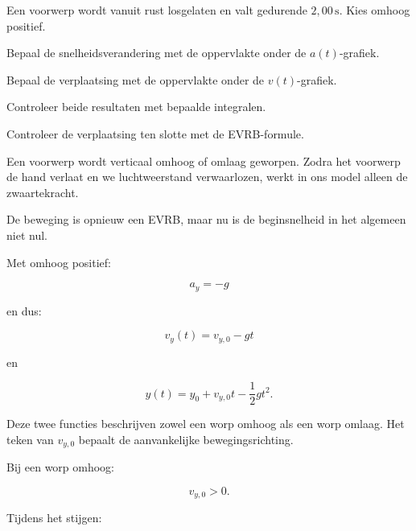 \documentclass{ximera}
\begin{document}
\begin{oefening}{\oefU\ESS}

Een voorwerp wordt vanuit rust losgelaten en valt gedurende
$2,00\,\mathrm{s}$. Kies omhoog positief.

\begin{question}
Bepaal de snelheidsverandering met de oppervlakte onder de
$a(t)$-grafiek.
\end{question}

\begin{question}
Bepaal de verplaatsing met de oppervlakte onder de $v(t)$-grafiek.
\end{question}

\begin{question}
Controleer beide resultaten met bepaalde integralen.
\end{question}

\begin{question}
Controleer de verplaatsing ten slotte met de EVRB-formule.
\end{question}

\end{oefening}




Een voorwerp wordt verticaal omhoog of omlaag geworpen. Zodra het
voorwerp de hand verlaat en we luchtweerstand verwaarlozen, werkt in
ons model alleen de zwaartekracht.

De beweging is opnieuw een EVRB, maar nu is de beginsnelheid in het
algemeen niet nul.

Met omhoog positief:

\[
\boxed{a_y=-g}
\]

en dus:

\[
\boxed{
v_y(t)=v_{y,0}-gt
}
\]

en

\[
\boxed{
y(t)=y_0+v_{y,0}t-\frac12gt^2.
}
\]

Deze twee functies beschrijven zowel een worp omhoog als een worp
omlaag. Het teken van $v_{y,0}$ bepaalt de aanvankelijke
bewegingsrichting.



Bij een worp omhoog:

\[
v_{y,0}>0.
\]

Tijdens het stijgen:
\end{document}
